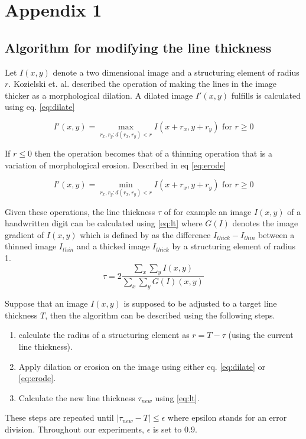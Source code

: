 \chapter{Appendix 1}

\section{Algorithm for modifying the line thickness}
\label{app:1}
Let $I(x,y)$ denote a two dimensional image and a structuring element of radius $r$. Kozielski et. al. \cite{kozielski2012moment} described the operation of making the lines in the image thicker as a morphological dilation. A dilated image $I'(x,y)$ fulfills is calculated using eq. \eqref{eq:dilate}

\begin{equation}
    \label{eq:dilate}
    I'(x,y) = \max_{r_x,r_y : d(r_x,r_y) < r} I(x+r_x,y+r_y) \text{ for } r \geq 0
\end{equation}

If $r \leq 0$ then the operation becomes that of a thinning operation that is a variation of morphological erosion. Described in eq \eqref{eq:erode}

\begin{equation}
    \label{eq:erode}
    I'(x,y) = \min_{r_x,r_y : d(r_x,r_y) < r} I(x+r_x,y+r_y) \text{ for } r \geq 0
\end{equation}

Given these operations, the line thickness $\tau$ of for example an image $I(x,y)$ of a handwritten digit can be calculated using \eqref{eq:lt} where $G(I)$ denotes the image gradient of $I(x,y)$ which is defined by \cite{kozielski2012moment} as the difference $I_{thick} - I_{thin}$ between a thinned image $I_{thin}$ and a thicked image $I_{thick}$ by a structuring element of radius 1.
\begin{equation}
    \label{eq:lt}
    \tau = 2\frac{\sum_x\sum_yI(x,y)}{\sum_x\sum_yG(I)(x,y)}
\end{equation}

Suppose that an image $I(x,y)$ is supposed to be adjusted to a target line thickness $T$, then the algorithm can be described using the following steps.

\begin{enumerate}
    \item calculate the radius of a structuring element as $r = T - \tau$ (using the current line thickness).
    \item Apply dilation or erosion on the image using either eq. \eqref{eq:dilate} or \eqref{eq:erode}.
    \item Calculate the new line thickness $\tau_{new}$ using \eqref{eq:lt}.
\end{enumerate}

These steps are repeated until $|\tau_{new} - T| \leq \epsilon$ where epsilon stands for an error division. Throughout our experiments, $\epsilon$ is set to 0.9.